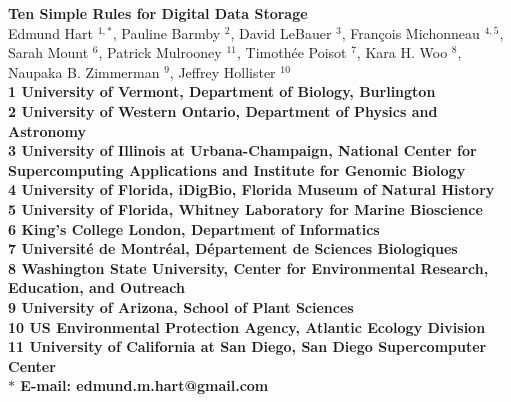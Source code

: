 \documentclass[10pt,letterpaper]{article}
\date{}
\begin{document}
\vspace*{0.35in}


\begin{flushleft}
{\Large
\textbf{Ten Simple Rules for Digital Data Storage}
}
\newline
\\
Edmund Hart $^{1 ,\ast}$,
Pauline Barmby $^{2 }$,
David LeBauer $^{3 }$,
François Michonneau $^{4,5 }$,
Sarah Mount $^{6 }$,
Patrick Mulrooney $^{11 }$,
Timothée Poisot $^{7 }$,
Kara H. Woo $^{8 }$,
Naupaka B. Zimmerman $^{9 }$,
Jeffrey Hollister $^{10 }$\\
\bigskip
\bf{1} University of Vermont, Department of Biology, Burlington
\\
\bf{2} University of Western Ontario, Department of Physics and Astronomy
\\
\bf{3} University of Illinois at Urbana-Champaign, National Center for Supercomputing Applications and Institute for
Genomic Biology
\\
\bf{4} University of Florida, iDigBio, Florida Museum of Natural History
\\
\bf{5} University of Florida, Whitney Laboratory for Marine Bioscience
\\
\bf{6} King's College London, Department of Informatics
\\
\bf{7} Université de Montréal, Département de Sciences Biologiques
\\
\bf{8} Washington State University, Center for Environmental Research, Education, and Outreach
\\
\bf{9} University of Arizona, School of Plant Sciences
\\
\bf{10} US Environmental Protection Agency, Atlantic Ecology Division
\\
\bf{11} University of California at San Diego, San Diego Supercomputer Center
\\
\bigskip
 $\ast$ E-mail: edmund.m.hart@gmail.com 










\end{flushleft}

\linenumbers
\end{document}

